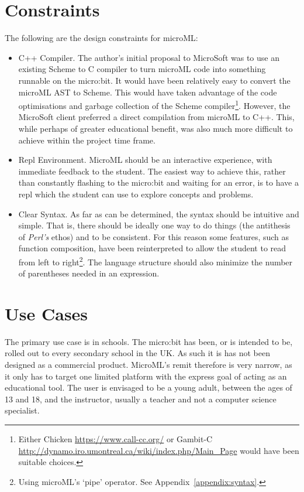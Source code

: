 \documentclass[12pt, a4paper]{report}
\begin{document}
\section{Constraints}
\label{constraints}
The following are the design constraints for microML\@:
\begin{itemize}
    \item C++ Compiler. The author's initial proposal to MicroSoft was to use an existing Scheme
        to C compiler to turn microML code into something runnable on the micro:bit. It would have
        been relatively easy to convert the microML AST to Scheme. This would have taken advantage of
        the code optimisations and garbage collection of the Scheme compiler\footnote{Either Chicken
        \url{https://www.call-cc.org/} or Gambit-C \url{http://dynamo.iro.umontreal.ca/wiki/index.php/Main_Page}
        would have been suitable choices.}. However, the MicroSoft client preferred a direct
        compilation from microML to C++. This, while perhaps of greater educational benefit, was also
        much more difficult to achieve within the project time frame.
    \item Repl Environment. MicroML should be an interactive experience, with immediate feedback to
        the student. The easiest way to achieve this, rather than constantly flashing to the
        micro:bit and waiting for an error, is to have a repl which the student can use to explore
        concepts and problems. 
    \item Clear Syntax. As far as can be determined, the syntax should be intuitive and simple. That
        is, there should be ideally one way to do things (the antithesis of \textit{Perl's} ethos)
        and to be consistent. For this reason some features, such as function composition, have been
        reinterpreted to allow the student to read from left to right\footnote{Using microML's
        `pipe' operator. See Appendix~\ref{appendix:syntax}.}. The language structure should also
        minimize the number of parentheses needed in an expression.
\end{itemize}

\section{Use Cases}
The primary use case is in schools. The micro:bit has been, or is intended to be, rolled out to
every secondary school in the UK\@. As such it is has not been designed as a commercial product.
MicroML's remit therefore is very narrow, as it only has to target one limited platform with the
express goal of acting as an educational tool. The user is envisaged to be a young adult, between
the ages of 13 and 18, and the instructor, usually a teacher and not a computer science specialist.
\end{document}
